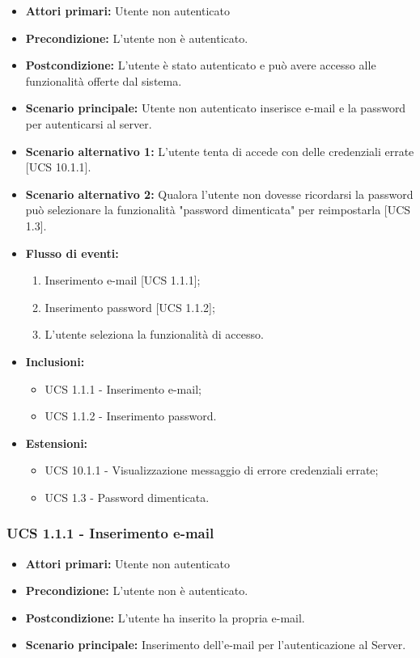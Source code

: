\begin{itemize}
\item \textbf{Attori primari:} Utente non autenticato
\item \textbf{Precondizione:} L'utente non è autenticato.
\item \textbf{Postcondizione:} L'utente è stato autenticato e può avere accesso alle funzionalità offerte dal sistema.
\item \textbf{Scenario principale:} Utente non autenticato inserisce e-mail e la password per autenticarsi al server.
\item \textbf{Scenario alternativo 1:} L'utente tenta di accede con delle credenziali errate [UCS 10.1.1].
\item \textbf{Scenario alternativo 2:} Qualora l'utente non dovesse ricordarsi la password può selezionare la funzionalità "password dimenticata" per reimpostarla [UCS 1.3].
\item \textbf{Flusso di eventi:}
    \begin{enumerate}
        \item Inserimento e-mail [UCS 1.1.1];
        \item Inserimento password [UCS 1.1.2];
        \item L'utente seleziona la funzionalità di accesso.
    \end{enumerate}
    \item \textbf{Inclusioni:}
	\begin{itemize}		
		\item UCS 1.1.1 - Inserimento e-mail;
		\item UCS 1.1.2 - Inserimento password.
	\end{itemize}
    \item \textbf{Estensioni:}
    \begin{itemize}
		\item UCS 10.1.1 - Visualizzazione messaggio di errore credenziali errate;
		\item UCS 1.3 - Password dimenticata.
	\end{itemize}
\end{itemize}

\subsubsection{UCS 1.1.1 - Inserimento e-mail}%
\begin{itemize}
\item \textbf{Attori primari:} Utente non autenticato
\item \textbf{Precondizione:} L'utente non è autenticato.
\item \textbf{Postcondizione:} L'utente ha inserito la propria e-mail.
\item \textbf{Scenario principale:} Inserimento dell'e-mail per l'autenticazione al Server.
\end{itemize}

